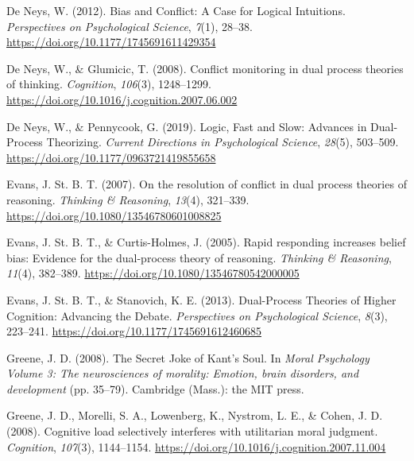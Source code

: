 \documentclass[
  man,floatsintext]{apa6}
\newlength{\cslhangindent}
\newlength{\cslentryspacingunit} %
\newenvironment{CSLReferences}[2] %
 {%
  \setlength{\parindent}{0pt}
  \ifodd #1
  \let\oldpar\par
  \def\par{\hangindent=\cslhangindent\oldpar}
  \fi
  \setlength{\parskip}{#2\cslentryspacingunit}
 }%
 {}
\begin{document}
\begin{CSLReferences}{1}{0}
\leavevmode{}%
De Neys, W. (2012). Bias and {Conflict}: {A Case} for {Logical Intuitions}. \emph{Perspectives on Psychological Science}, \emph{7}(1), 28--38. \url{https://doi.org/10.1177/1745691611429354}

\leavevmode{}%
De Neys, W., \& Glumicic, T. (2008). Conflict monitoring in dual process theories of thinking. \emph{Cognition}, \emph{106}(3), 1248--1299. \url{https://doi.org/10.1016/j.cognition.2007.06.002}

\leavevmode{}%
De Neys, W., \& Pennycook, G. (2019). Logic, {Fast} and {Slow}: {Advances} in {Dual-Process Theorizing}. \emph{Current Directions in Psychological Science}, \emph{28}(5), 503--509. \url{https://doi.org/10.1177/0963721419855658}

\leavevmode{}%
Evans, J. St. B. T. (2007). On the resolution of conflict in dual process theories of reasoning. \emph{Thinking \& Reasoning}, \emph{13}(4), 321--339. \url{https://doi.org/10.1080/13546780601008825}

\leavevmode{}%
Evans, J. St. B. T., \& Curtis-Holmes, J. (2005). Rapid responding increases belief bias: {Evidence} for the dual-process theory of reasoning. \emph{Thinking \& Reasoning}, \emph{11}(4), 382--389. \url{https://doi.org/10.1080/13546780542000005}

\leavevmode{}%
Evans, J. St. B. T., \& Stanovich, K. E. (2013). Dual-{Process Theories} of {Higher Cognition}: {Advancing} the {Debate}. \emph{Perspectives on Psychological Science}, \emph{8}(3), 223--241. \url{https://doi.org/10.1177/1745691612460685}

\leavevmode{}%
Greene, J. D. (2008). The {Secret Joke} of {Kant}'s {Soul}. In \emph{Moral {Psychology Volume} 3: {The} neurosciences of morality: Emotion, brain disorders, and development} (pp. 35--79). {Cambridge (Mass.)}: {the MIT press}.

\leavevmode{}%
Greene, J. D., Morelli, S. A., Lowenberg, K., Nystrom, L. E., \& Cohen, J. D. (2008). Cognitive load selectively interferes with utilitarian moral judgment. \emph{Cognition}, \emph{107}(3), 1144--1154. \url{https://doi.org/10.1016/j.cognition.2007.11.004}


\end{CSLReferences}
\end{document}
